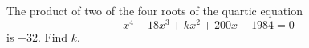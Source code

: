 The product of two of the four roots of the quartic equation
\[
x^4-18x^3+kx^2+200x-1984=0
\]
is $-32$. Find $k$.

